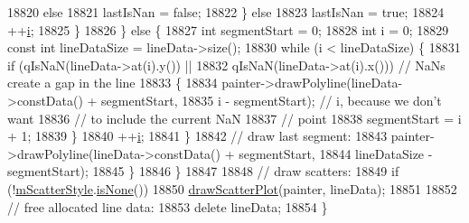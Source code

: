 \begin{DoxyCode}
18820           \textcolor{keywordflow}{else}
18821             lastIsNan = \textcolor{keyword}{false};
18822         \} \textcolor{keywordflow}{else}
18823           lastIsNan = \textcolor{keyword}{true};
18824         ++\hyperlink{_comparision_pictures_2_createtest_image_8m_a6f6ccfcf58b31cb6412107d9d5281426}{i};
18825       \}
18826     \} \textcolor{keywordflow}{else} \{
18827       \textcolor{keywordtype}{int} segmentStart = 0;
18828       \textcolor{keywordtype}{int} i = 0;
18829       \textcolor{keyword}{const} \textcolor{keywordtype}{int} lineDataSize = lineData->size();
18830       \textcolor{keywordflow}{while} (i < lineDataSize) \{
18831         \textcolor{keywordflow}{if} (qIsNaN(lineData->at(i).y()) ||
18832             qIsNaN(lineData->at(i).x())) \textcolor{comment}{// NaNs create a gap in the line}
18833         \{
18834           painter->drawPolyline(lineData->constData() + segmentStart,
18835                                 i - segmentStart); \textcolor{comment}{// i, because we don't want}
18836                                                    \textcolor{comment}{// to include the current NaN}
18837                                                    \textcolor{comment}{// point}
18838           segmentStart = i + 1;
18839         \}
18840         ++\hyperlink{_comparision_pictures_2_createtest_image_8m_a6f6ccfcf58b31cb6412107d9d5281426}{i};
18841       \}
18842       \textcolor{comment}{// draw last segment:}
18843       painter->drawPolyline(lineData->constData() + segmentStart,
18844                             lineDataSize - segmentStart);
18845     \}
18846   \}
18847 
18848   \textcolor{comment}{// draw scatters:}
18849   \textcolor{keywordflow}{if} (!\hyperlink{class_q_c_p_curve_a08f803b4a30b01bbd7a1eab15d0f864f}{mScatterStyle}.\hyperlink{class_q_c_p_scatter_style_aa3861281108d0adbeb291c820ea3925c}{isNone}())
18850     \hyperlink{class_q_c_p_curve_a45593f30b81beec4b6130b6b53306087}{drawScatterPlot}(painter, lineData);
18851 
18852   \textcolor{comment}{// free allocated line data:}
18853   \textcolor{keyword}{delete} lineData;
18854 \}
\end{DoxyCode}


